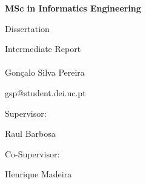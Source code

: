\begin{titlepage}



\large{\bf MSc in Informatics Engineering}

\normalsize{Dissertation}

\small{Intermediate Report}
\\[0.6in]

\Huge
\textbf{}\\[0.3in]

\normalsize{Gonçalo Silva Pereira}

\small{gsp@student.dei.uc.pt}

\vspace{0.5cm}

\small{Supervisor:}

\normalsize{Raul Barbosa}

\vspace{0.3cm}

\small{Co-Supervisor:}

\normalsize{Henrique Madeira}\\[0.3in]






\end{titlepage}

